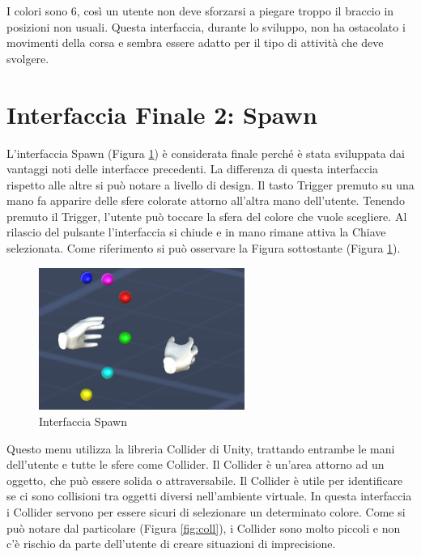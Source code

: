 \documentclass[target=bach,aauheader=]{thud}
\begin{document}
I colori sono 6, così un utente non deve sforzarsi a piegare troppo il braccio in posizioni non usuali.
Questa interfaccia, durante lo sviluppo, non ha ostacolato i movimenti della corsa e sembra essere adatto per il tipo di attività che deve svolgere. 

\section{Interfaccia Finale 2: Spawn} %
\label{int_spawn}
L'interfaccia Spawn (Figura \ref{fig:spawn}) è considerata finale perché è stata sviluppata dai vantaggi noti delle interfacce precedenti.
La differenza di questa interfaccia rispetto alle altre si può notare a livello di design.
Il tasto Trigger premuto su una mano fa apparire delle sfere colorate attorno all'altra mano dell'utente.
Tenendo premuto il Trigger, l'utente può toccare la sfera del colore che vuole scegliere.
Al rilascio del pulsante l'interfaccia si chiude e in mano rimane attiva la Chiave selezionata. 
Come riferimento si può osservare la Figura sottostante (Figura \ref{fig:spawn}). \\

\begin{figure}[h]
    \centering
    \includegraphics[width=0.60\textwidth]{spawn}
    \caption{Interfaccia Spawn}
    \label{fig:spawn}
\end{figure}

Questo menu utilizza la libreria Collider di Unity, trattando entrambe le mani dell'utente e tutte le sfere come Collider.
Il Collider è un'area attorno ad un oggetto, che può essere solida o attraversabile.
Il Collider è utile per identificare se ci sono collisioni tra oggetti diversi nell'ambiente virtuale.
In questa interfaccia i Collider servono per essere sicuri di selezionare un determinato colore.
Come si può notare dal particolare (Figura \ref{fig:coll}), i Collider sono molto piccoli e non c'è rischio da parte dell'utente di creare situazioni di imprecisione. \\
\end{document}
